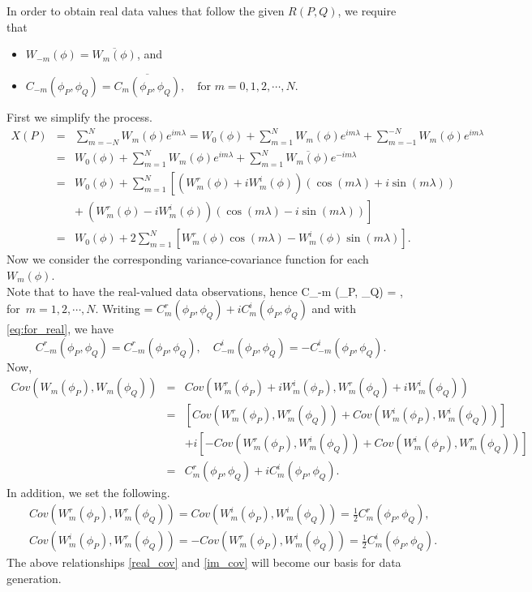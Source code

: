 In order to obtain real data values that follow the given $R(P, Q)$, we require that
\begin{itemize}
\item $W_{-m}(\phi) = \overline{W_m(\phi)}$, and
\item $ C_{-m} (\phi_P, \phi_Q) = \overline{C_m(\phi_P, \phi_Q)}, \quad \mbox{for $m = 0, 1, 2, \cdots, N$.}$
\end{itemize}
First we simplify the process.
	\begin{eqnarray} \label{eq:finite_process}
		X(P) &=& \sum_{m = -N}^N W_m(\phi) e^{im \lambda} =  W_0(\phi) + \sum_{m =1}^N W_m(\phi) e^{im \lambda} + \sum_{m =-1}^{-N} W_m(\phi) e^{im \lambda} \nonumber \\
		&=& W_0(\phi) + \sum_{m =1}^N W_m(\phi) e^{im \lambda} + \sum_{m =1}^{N} \overline{W_m(\phi)} e^{-im \lambda} \nonumber \\
		&=& W_0(\phi) + \sum_{m =1}^N \left[  (W_m^r(\phi)+iW_m^i(\phi))(\cos(m \lambda) + i \sin(m \lambda)) \right. \nonumber \\
		& & \left. +\ (W_m^r(\phi)-iW_m^i(\phi))(\cos(m \lambda) - i \sin(m \lambda))  \right]  \nonumber \\
		&=& W_0(\phi) + 2 \sum_{m =1}^N \left[W_m^r(\phi)\cos(m\lambda) - W_m^i(\phi)\sin(m \lambda)\right].
	\end{eqnarray}
Now we consider the corresponding variance-covariance function for each $W_m(\phi)$.  \\ 			
 
Note that to have the real-valued data observations, hence
	\beq \label{eq:for_real}
	C_{-m} (\phi_P, \phi_Q) = , \quad \mbox{for $m = 1, 2, \cdots, N$}.
	\eeq
	Writing \Cm = $C_m^{r}(\phi_P, \phi_Q) + iC_m^{i}(\phi_P, \phi_Q)$ and with \eqref{eq:for_real}, we have
	\[
		C_{-m}^r(\phi_P, \phi_Q) = C_{-m}^r(\phi_P, \phi_Q), \quad C_{-m}^i(\phi_P, \phi_Q) = - C_{-m}^i(\phi_P, \phi_Q).
	\]
	Now,
	\begin{eqnarray*}
		Cov(W_m(\phi_P), {W_m(\phi_Q)}) &=& Cov(W_m^r(\phi_P) + iW_m^i(\phi_P), W_m^r(\phi_Q) + i W_m^i(\phi_Q)) \\
		&=& \left[Cov(W_m^r(\phi_P), W_m^r(\phi_Q)) + Cov(W_m^i(\phi_P), W_m^i(\phi_Q))\right] \\
		& & + i\left[- Cov(W_m^r(\phi_P), W_m^i(\phi_Q)) + Cov(W_m^i(\phi_P), W_m^r(\phi_Q))\right] \\
		&=& C_m^r(\phi_P, \phi_Q) + i C_m^i(\phi_P, \phi_Q).
	\end{eqnarray*}
	In addition, we set the following.		
	\begin{eqnarray} \label{real_cov}
		& & Cov(W_m^r(\phi_P), W_m^r(\phi_Q)) = Cov(W_m^i(\phi_P), W_m^i(\phi_Q)) = \frac{1}{2}C_m^r(\phi_P, \phi_Q), \label{real_cov} \\
		& & Cov(W_m^i(\phi_P), W_m^r(\phi_Q)) = - Cov(W_m^r(\phi_P), W_m^i(\phi_Q)) = \frac{1}{2}C_m^i(\phi_P, \phi_Q). \label{im_cov}
	\end{eqnarray}
The above relationships \eqref{real_cov} and \eqref{im_cov} will become our basis for data generation.
	
